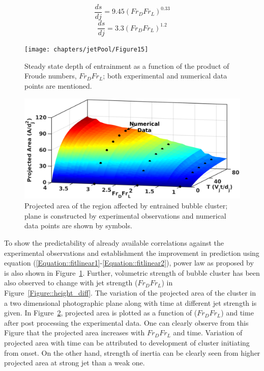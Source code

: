 \begin{equation}
\frac{ds}{dj} = 9.45(Fr_DFr_L)^{0.33}
\label{Equation::fitlinear1}
\end{equation}%
\begin{equation}
\frac{ds}{dj} = 3.3(Fr_DFr_L)^{1.2}
\label{Equation::fitlinear2}
\end{equation}%
\begin{figure}
	\centering
	\texttt{[image: chapters/jetPool/Figure15]}
	\caption{Steady state depth of entrainment as a function of the product of Froude numbers, $Fr_DFr_L$; both experimental and numerical data points are mentioned.}
	\label{Figure::hFr}
\end{figure}
\begin{figure}
	\centering
	\includegraphics[width=\linewidth]{chapters/jetPool/Figure16}
	\caption{Projected area of the region affected by entrained bubble cluster; plane is constructed by experimental observations and numerical data points are shown by symbols.}
	\label{Figure::area}
\end{figure}
To show the predictability of already available correlations against the experimental observations and establishment the improvement in prediction using equation (\ref{Equation::fitlinear1}-\ref{Equation::fitlinear2}), power law as proposed by \citet{ohkawa1986some} is also shown in Figure~\ref{Figure::hFr}.
Further, volumetric strength of bubble cluster has been also observed to change with jet strength ($Fr_DFr_L$) in Figure~\ref{Figure::height_diff}. The variation of the projected area of the cluster in a two dimensional photographic plane along with time at different jet strength is given. In Figure~\ref{Figure::area}, projected area is plotted as a function of ($Fr_DFr_L$) and time after post processing the experimental data. One can clearly observe from this Figure that the projected area increases with $Fr_DFr_L$ and time. Variation of projected area with time can be attributed to development of cluster initiating from onset. On the other hand, strength of inertia can be clearly seen from higher projected area at strong jet than a weak one. \\
